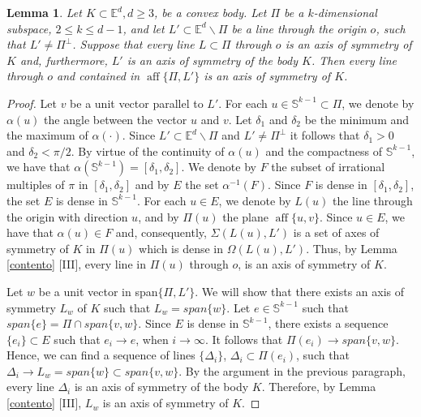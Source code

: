 \documentclass[12pt,thmsa]{amsart}
\newcommand{\Ed}{\mathbb{E}^{d}}
\newcommand{\aff}{\operatorname*{aff}}
\newtheorem{lemma}{Lemma}
\begin{document}
\begin{lemma}\label{kiara} 
Let $K\subset \Ed, d\geq 3$, be a convex body. Let $\Pi$ be a $k$-dimensional subspace, $2\leq k\leq d-1$, and let $L'\subset \Ed \backslash \Pi$ be a line through the origin $o$, such that  $L'\not=\Pi^{\perp}$. 
Suppose that every line $L\subset \Pi$ through $o$ is an axis of symmetry of $K$ and, furthermore, $L'$ is an axis of symmetry of the body $K$. Then every line through $o$ and contained in $\aff\{\Pi, L'\}$ is an axis of symmetry of $K$.
\end{lemma}
\begin{proof}
Let $v$ be a unit vector parallel to $L'$. For each $u\in \mathbb{S}^{k-1} \subset \Pi$, we denote by $\alpha(u)$ the angle between the vector $u$ and $v$. Let $\delta_1$ and $\delta_2$ be the minimum and the maximum of $\alpha (\cdot)$.  Since $L'\subset \Ed \backslash \Pi$ and $L'\not=\Pi^{\perp}$ it follows that $\delta_1>0$ and $\delta_2<\pi/2$. By virtue of the continuity of $\alpha(u)$ and the compactness of $\mathbb{S}^{k-1}$, we have that 
$\alpha (\mathbb{S}^{k-1})=[\delta_1,\delta_2]$. We denote by $F$ the subset of irrational multiples of $\pi$ in $[\delta_1,\delta_2]$ and by $E$ the set $\alpha^{-1}(F)$. Since $F$ is dense in $[\delta_1,\delta_2]$, the set $E$ is dense in $\mathbb{S}^{k-1}$. For each $u\in E$, we denote by $L(u)$ the line through the origin with direction $u$, and by $\Pi(u)$ the plane 
$\aff \{u,v\}$. Since $u\in E$, we have that $\alpha(u)\in F$ and, consequently, 
$\Sigma(L(u), L')$ is a set of axes of symmetry of $K$ in $\Pi(u)$ which is dense in 
$\Omega(L(u), L')$. Thus, by Lemma \ref{contento} [III], every line in $\Pi(u)$ through $o$, is an axis of symmetry of $K$. 


Let $w$ be a unit vector in span$\{\Pi,L'\}$. We will show that  there exists an axis of symmetry $L_w$ of $K$ such that $L_w=span\{w\}$. Let $e \in \mathbb{S}^{k-1}$ such that 
$span\{e\}=\Pi \cap span\{v,w\}$. Since $E$ is dense in $\mathbb{S}^{k-1}$, there exists a sequence $\{e_i\}\subset E$ such that $e_i \rightarrow e$, when $i \rightarrow \infty$. It follows that $\Pi(e_i) \rightarrow span\{v,w\}$. Hence, we can find a sequence of lines $\{\Delta_i\}$, $\Delta_i \subset \Pi(e_i)$, such that $\Delta_i \rightarrow L_w=span\{w\}\subset span\{v,w\}$. By the argument in the previous paragraph, every line $\Delta_i$ is an axis of symmetry of the body $K$. Therefore, by Lemma \ref{contento} [III], $L_w$ is an axis of symmetry of $K$.
\end{proof}
\end{document}
